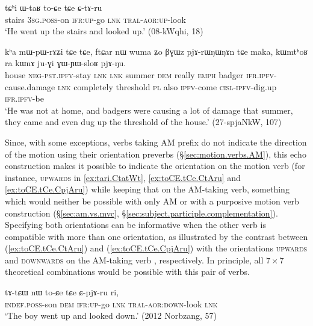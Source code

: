 \begin{exe}
\ex \label{ex:toCE.tCe.CtAru}
\gll tɕʰi ɯ-taʁ to-ɕe tɕe ɕ-tɤ-ru   \\
stairs \textsc{3sg}.\textsc{poss}-on \textsc{ifr}:\textsc{up}-go \textsc{lnk}  \textsc{tral}-\textsc{aor}:\textsc{up}-look \\
\glt `He went up the stairs and looked up.'  (08-kWqhi, 18)
\end{exe}

\begin{exe}
\ex \label{ex:GWYWsloR}
\gll kʰa mɯ-pɯ-rɤʑi tɕe tɕe, ftɕar nɯ wuma ʑo βɣɯz pjɤ-rɯŋɯŋɤn tɕe maka, kɯmtʰoʁ ra kɯnɤ ju-ɣi ɣɯ-ɲɯ-sloʁ pjɤ-ŋu. \\
house \textsc{neg}-\textsc{pst}.\textsc{ipfv}-stay \textsc{lnk} \textsc{lnk} summer \textsc{dem} really \textsc{emph} badger \textsc{ifr}.\textsc{ipfv}-cause.damage \textsc{lnk} completely threshold \textsc{pl} also \textsc{ipfv}-come \textsc{cisl}-\textsc{ipfv}-dig.up \textsc{ifr}.\textsc{ipfv}-be \\
\glt `He was not at home, and badgers were causing a lot of damage that summer, they came and even dug up the threshold of the house.'  (27-spjaNkW, 107)
\end{exe}

Since, with some exceptions, verbs taking AM prefix do not indicate the direction of the motion using their orientation preverbs (§\ref{sec:motion.verbs.AM}), this echo construction makes it possible to indicate the orientation on the motion verb (for instance, \textsc{upwards} in \ref{ex:tari.CtatWt}, \ref{ex:toCE.tCe.CtAru} and \ref{ex:toCE.tCe.CpjAru}) while keeping that on the AM-taking verb, something which would neither be possible with only AM or with a purposive motion verb construction (§\ref{sec:am.vs.mvc}, §\ref{sec:subject.participle.complementation}). Specifying both orientations can be informative when the other verb is compatible with more than one orientation, as illustrated by the contrast between (\ref{ex:toCE.tCe.CtAru}) and (\ref{ex:toCE.tCe.CpjAru}) with the orientations \textsc{upwards} and \textsc{downwards} on the AM-taking verb , respectively. In principle, all $7\times7$ theoretical combinations would be possible with this pair of verbs.

\begin{exe}
\ex \label{ex:toCE.tCe.CpjAru}
\gll tɤ-tɕɯ nɯ to-ɕe tɕe ɕ-pjɤ-ru ri, \\
\textsc{indef}.\textsc{poss}-son \textsc{dem} \textsc{ifr}:\textsc{up}-go \textsc{lnk}  \textsc{tral}-\textsc{aor}:\textsc{down}-look \textsc{lnk} \\
\glt `The boy went up and looked down.' (2012 Norbzang, 57)
\end{exe}

